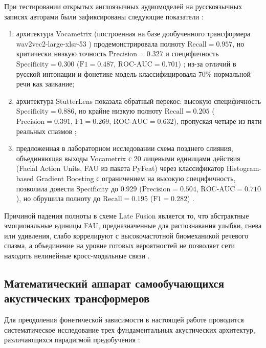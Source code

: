 \documentclass[a4paper,14pt]{extarticle}
\begin{document}
	При тестировании открытых англоязычных аудиомоделей на русскоязычных записях авторами были зафиксированы следующие показатели \cite{ivankin}:
	\begin{enumerate}
		\item архитектура Vocametrix (построенная на базе дообученного трансформера wav2vec2-\allowbreak large-\allowbreak xlsr-53 \cite{wav2vec}) продемонстрировала полноту $\text{Recall} = 0.957$, но критически низкую точность $\text{Precision} = 0.327$ и специфичность $\text{Specificity} = 0.300$ ($\text{F1} = 0.487$, $\text{ROC-AUC} = 0.701$) \cite{ivankin}; из-за отличий в русской интонации и фонетике модель классифицировала 70\% нормальной речи как заикание;
		\item архитектура StutterLens показала обратный перекос: высокую специфичность $\text{Specificity} = 0.886$, но крайне низкую полноту $\text{Recall} = 0.205$ ($\text{Precision} = 0.391$, $\text{F1} = 0.269$, $\text{ROC-AUC} = 0.632$), пропуская четыре из пяти реальных спазмов \cite{ivankin};
		\item предложенная в лабораторном исследовании схема позднего слияния, объединяющая выходы Vocametrix с 20 лицевыми единицами действия (Facial Action Units, FAU из пакета PyFeat) через классификатор Histogram-based Gradient Boosting с ограничением на высокую специфичность, позволила довести $\text{Specificity}$ до $0.929$ ($\text{Precision} = 0.504$, $\text{ROC-AUC} = 0.710$), но обрушила полноту до $\text{Recall} = 0.195$ ($\text{F1} = 0.282$) \cite{ivankin}.
	\end{enumerate}
	
	Причиной падения полноты в схеме Late Fusion является то, что абстрактные эмоциональные единицы FAU, предназначенные для распознавания улыбки, гнева или удивления, слабо коррелируют с высокочастотной биомеханикой речевого спазма, а объединение на уровне готовых вероятностей не позволяет сети находить нелинейные кросс-модальные связи \cite{ivankin}.
	
	\subsection{Математический аппарат самообучающихся акустических трансформеров}
	Для преодоления фонетической зависимости в настоящей работе проводится систематическое исследование трех фундаментальных акустических архитектур, различающихся парадигмой предобучения \cite{wav2vec, wavlm, whisper}:
	
\end{document}
